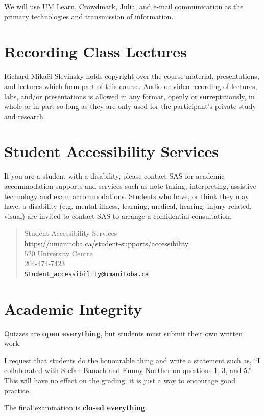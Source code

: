 \documentclass[12pt]{article}
\begin{document}
We will use UM Learn, Crowdmark, {\sc Julia}, and e-mail communication as the primary technologies and transmission of information.

\section{Recording Class Lectures}

Richard Mika\"el Slevinsky holds copyright over the course material, presentations, and lectures which form part of this course. Audio or video recording of lectures, labs, and/or presentations is allowed in any format, openly or surreptitiously, in whole or in part so long as they are only used for the participant's private study and research.

\section{Student Accessibility Services}

If you are a student with a disability, please contact SAS for academic accommodation supports and services such as note-taking, interpreting, assistive technology and exam accommodations. Students who have, or think they may have, a disability (e.g. mental illness, learning, medical, hearing, injury-related, visual) are invited to contact SAS to arrange a confidential consultation. 

\begin{quote}
Student Accessibility Services \\
\url{https://umanitoba.ca/student-supports/accessibility} \\
520 University Centre \\
204-474-7423 \\
\href{mailto:Student_accessibility@umanitoba.ca}{\texttt{Student\_accessibility@umanitoba.ca}}
\end{quote}

\section{Academic Integrity}

Quizzes are {\bf open everything}, but students must submit their own written work.

I request that students do the honourable thing and write a statement such as, ``I collaborated with Stefan Banach and Emmy Noether on questions 1, 3, and 5.'' This will have no effect on the grading; it is just a way to encourage good practice.

The final examination is {\bf closed everything}.
\end{document}

